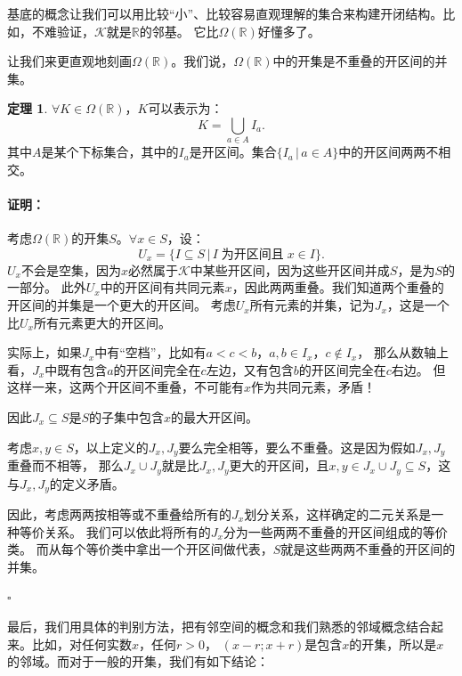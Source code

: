 \documentclass[12pt,UTF8]{ctexbook}
\theoremstyle{definition}
\newtheorem{tm}{定理}[section]
\theoremstyle{plain}
\renewenvironment{proof}{\paragraph{\textbf{证明：}}}{\hfill$\square$}
\begin{document}
\begin{appendix}
基底的概念让我们可以用比较“小”、比较容易直观理解的集合来构建开闭结构。比如，不难验证，$\mathcal{K}$就是$\mathbb{R}$的邻基。
它比$\Omega(\mathbb{R})$好懂多了。


让我们来更直观地刻画$\Omega(\mathbb{R})$。我们说，$\Omega(\mathbb{R})$中的开集是不重叠的开区间的并集。
\begin{tm}\label{tm:a-1-20}
    $\forall K \in \Omega(\mathbb{R})$，$K$可以表示为：
    $$ K = \bigcup_{a\in A} I_a. $$
    其中$A$是某个下标集合，其中的$I_a$是开区间。集合$\{I_a \, | \, a\in A\}$中的开区间两两不相交。
\end{tm}

\begin{proof}
    考虑$\Omega(\mathbb{R})$的开集$S$。$\forall x\in S$，设：
    $$ U_x = \{I\subseteq S \, | \, I\;\mbox{为开区间且}\;x\in I \}.$$
    $U_x$不会是空集，因为$x$必然属于$\mathcal{K}$中某些开区间，因为这些开区间并成$S$，是为$S$的一部分。
    此外$U_x$中的开区间有共同元素$x$，因此两两重叠。我们知道两个重叠的开区间的并集是一个更大的开区间。
    考虑$U_x$所有元素的并集，记为$J_x$，这是一个比$U_x$所有元素更大的开区间。
    
    实际上，如果$J_x$中有“空档”，比如有$a<c<b$，$a, b\in I_x$，$c\notin I_x$，
    那么从数轴上看，$J_x$中既有包含$a$的开区间完全在$c$左边，又有包含$b$的开区间完全在$c$右边。
    但这样一来，这两个开区间不重叠，不可能有$x$作为共同元素，矛盾！
    
    因此$J_x\subseteq S$是$S$的子集中包含$x$的最大开区间。

    考虑$x,y\in S$，以上定义的$J_x, J_y$要么完全相等，要么不重叠。这是因为假如$J_x, J_y$重叠而不相等，
    那么$J_x\cup J_y$就是比$J_x, J_y$更大的开区间，且$x,y\in J_x\cup J_y\subseteq S$，这与$J_x, J_y$的定义矛盾。

    因此，考虑两两按相等或不重叠给所有的$J_x$划分关系，这样确定的二元关系是一种等价关系。
    我们可以依此将所有的$J_x$分为一些两两不重叠的开区间组成的等价类。
    而从每个等价类中拿出一个开区间做代表，$S$就是这些两两不重叠的开区间的并集。

\end{proof}

最后，我们用具体的判别方法，把有邻空间的概念和我们熟悉的邻域概念结合起来。比如，对任何实数$x$，任何$r>0$，
$(x-r;x+r)$是包含$x$的开集，所以是$x$的邻域。而对于一般的开集，我们有如下结论：


\end{appendix}
\end{document}

